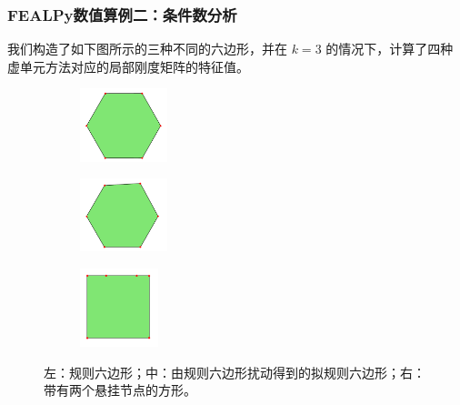 \documentclass[notheorems,serif]{beamer}
\begin{document}
\begin{frame}
    \frametitle{FEALPy数值算例二：条件数分析}
我们构造了如下图所示的三种不同的六边形，并在 $k=3$ 的情况下，计算了四种虚单元方法对应的局部刚度矩阵的特征值。
\begin{figure}[htbp]
\centering
\begin{subfigure}[t]{0.32\linewidth}
    \centering
    \includegraphics[width=1in]{../figures/stabfree/hexagon0.pdf}
\end{subfigure}%
\begin{subfigure}[t]{0.32\linewidth}
    \centering
    \includegraphics[width=1in]{../figures/stabfree/hexagon1.pdf}
\end{subfigure}%
\begin{subfigure}[t]{0.32\linewidth}
    \centering
    \includegraphics[width=0.9in]{../figures/stabfree/hexagon2.pdf}
\end{subfigure}
\caption{左：规则六边形；中：由规则六边形扰动得到的拟规则六边形；右：带有两个悬挂节点的方形。}
\label{fig:all}
\end{figure}
\end{frame}
\end{document}

